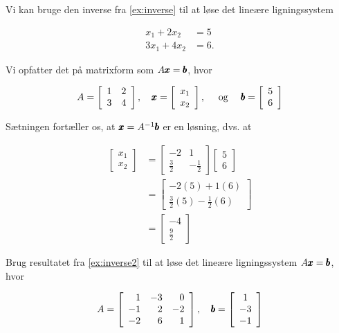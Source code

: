 \begin{example}
Vi kan bruge den inverse fra \autoref{ex:inverse} til at løse det lineære ligningssystem

\[
\begin{aligned}
x_1+2 x_2 & =5 \\
3 x_1+4 x_2 & =6 .
\end{aligned}
\]

Vi opfatter det på matrixform som \(A \pmb{x}=\pmb{b}\), hvor

\[
A=\left[\begin{array}{ll}
1 & 2 \\
3 & 4
\end{array}\right], \quad \pmb{x}=\left[\begin{array}{l}
x_1 \\
x_2
\end{array}\right], \quad \text { og } \quad \pmb{b}=\left[\begin{array}{l}
5 \\
6
\end{array}\right]
\]

Sætningen fortæller os, at \(\pmb{x}=A^{-1} \pmb{b}\) er en løsning, dvs. at

\[
\begin{aligned}
{\left[\begin{array}{l}
x_1 \\
x_2
\end{array}\right] } & =\left[\begin{array}{cc}
-2 & 1 \\
\frac{3}{2} & -\frac{1}{2}
\end{array}\right]\left[\begin{array}{l}
5 \\
6
\end{array}\right] \\
& =\left[\begin{array}{c}
-2(5)+1(6) \\
\frac{3}{2}(5)-\frac{1}{2}(6)
\end{array}\right] \\
& =\left[\begin{array}{c}
-4 \\
\frac{9}{2}
\end{array}\right]
\end{aligned}
\]
\end{example}

\begin{example} Brug resultatet fra \autoref{ex:inverse2} til at løse det lineære ligningssystem $A \pmb{x} = \pmb{b}$, hvor

    \[A=\left[\begin{array}{rrr}1 & -3 & 0 \\ -1 & 2 & -2 \\ -2 & 6 & 1\end{array}\right], \quad \pmb{b}=\left[\begin{array}{c}1 \\ -3 \\ -1\end{array}\right]\]

\end{example}

